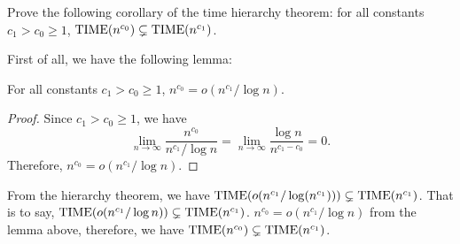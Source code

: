 \documentclass{homework}
\begin{document}
\begin{problem}
  Prove the following corollary of the time hierarchy theorem: for all constants
  $c_1 > c_0 \ge 1$, $\textup{TIME}(n^{c_0}) \subsetneq \textup{TIME}(n^{c_1})$.
\end{problem}

\begin{solution}

  First of all, we have the following lemma:
  \begin{lemma}
    For all constants $c_1 > c_0 \ge 1$, $n^{c_0} = o(n^{c_1}/\log n)$.
  \end{lemma}
  \begin{proof}
    Since $c_1 > c_0 \ge 1$, we have
    \begin{equation*}
      \lim_{n \to \infty} \frac{n^{c_0}}{n^{c_1}/\log n}
      = \lim_{n \to \infty} \frac{\log n}{n^{c_1 - c_0}}
      = 0.
    \end{equation*}
    Therefore, $n^{c_0} = o(n^{c_1}/\log n)$.
  \end{proof}
  
  From the hierarchy theorem,
  we have $\textup{TIME}(o(n^{c_1}/\log(n^{c_1}))) \subsetneq \textup{TIME}(n^{c_1})$.
  That is to say, $\textup{TIME}(o(n^{c_1}/\log n)) \subsetneq \textup{TIME}(n^{c_1})$.
  $n^{c_0} = o(n^{c_1}/\log n)$ from the lemma above,
  therefore, we have $\textup{TIME}(n^{c_0}) \subsetneq \textup{TIME}(n^{c_1})$.
  
\end{solution}

\begin{problem}
\end{problem}
\end{document}
